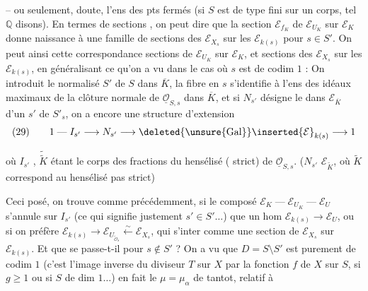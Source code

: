 -- ou seulement,  doute, l'ens des pts fermés (si $S$ est de type fini sur un corps, tel $\mathbb Q$ disons). En termes de sections , on peut dire que la section $\mathcal E_{f_K}$ de $\mathcal E_{U_K}$ sur $\mathcal E_K$ donne naissance à une famille de sections des $\mathcal E_{X_s}$ sur les $\mathcal E_{k(s)}$ pour $s\in S'$. On peut   ainsi cette correspondance  sections de $\mathcal E_{U_K}$ sur $\mathcal E_K$, et sections des $\mathcal E_{X_s}$ sur les $\mathcal E_{k(s)}$, en généralisant ce qu'on a vu dans le cas où $s$ est de codim $1$ : On introduit le normalisé $S'$ de $S$ dans $\overline K$, la fibre en $s$ s'identifie à l'ens des idéaux maximaux de la clôture normale de $\underline{\mathcal O}_{S,s}$ dans $\overline K$, et si $N_{s'}$ désigne le   dans $\mathcal E_{\overline K}$ d'un $s'$ de $S'_s$, on a encore une structure d'extension
\[
(29)\qquad
1\mathrel{\text{---}}I_{s'}\longrightarrow N_{s'}\longrightarrow {\deleted{\unsure{\operatorname{Gal}}}\inserted{\mathcal E}}_{k(s)}\longrightarrow 1
\]

où $I_{s'}$  , $\widetilde{\widetilde K}$ étant le corps
des fractions du hensélisé ( strict)
de $\underline{\mathcal O}_{S,s}$. ($N_{s'}$  
$\mathcal E_{\widetilde K}$, où $\widetilde K$ correspond au hensélisé pas strict)

Ceci posé, on trouve comme précédemment,
si le composé  $\mathcal E_K\mathrel{\text{---}}\mathcal E_{U_K}\mathrel{\text{---}}\mathcal E_U$
s'annule sur $I_{s'}$   (ce qui signifie
justement  $s'\in S'\ldots$) que un hom
$\mathcal E_{k(s)}\longrightarrow\mathcal E_U$, ou si on préfère
$\mathcal E_{k(s)}\longrightarrow\mathcal E_{U_{\widetilde{\mathcal O}_s}}\xleftarrow{\sim}\mathcal E_{X_s}$, qui   s'inter%
 comme une section de $\mathcal E_{X_s}$ sur
$\mathcal E_{k(s)}$. Et que se passe-t-il pour
$s\notin S'$ ?  On a vu que
$D=S\setminus S'$ est purement de codim $1$
(c'est l'image inverse du diviseur
$T$ sur $X$ par la fonction $f$ de $X$ sur $S$,
 si $g\geq1$ ou si $S$ de dim $1\ldots$)
en fait le $\mu=\mu_\alpha$ de tantot, relatif à

